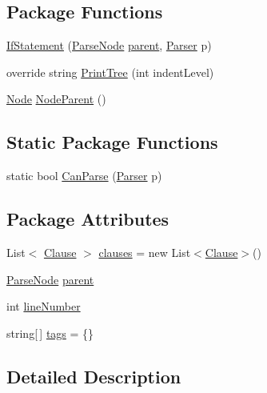 \subsection*{Package Functions}
\begin{DoxyCompactItemize}
\item 
\hyperlink{a00094_ae534078389e8663edf7660403acf3cbc}{If\-Statement} (\hyperlink{a00122}{Parse\-Node} \hyperlink{a00122_af313a82103fcc2ff5a177dbb06b92f7b}{parent}, \hyperlink{a00123}{Parser} p)
\item 
override string \hyperlink{a00094_a5494c1daef8e0f3ac3ab68f91db4f332}{Print\-Tree} (int indent\-Level)
\item 
\hyperlink{a00112}{Node} \hyperlink{a00122_a580e520a29444fc23ac3660cbe514a09}{Node\-Parent} ()
\end{DoxyCompactItemize}
\subsection*{Static Package Functions}
\begin{DoxyCompactItemize}
\item 
static bool \hyperlink{a00094_afd6b96e1a27872701c4e6832f17fc3ce}{Can\-Parse} (\hyperlink{a00123}{Parser} p)
\end{DoxyCompactItemize}
\subsection*{Package Attributes}
\begin{DoxyCompactItemize}
\item 
List$<$ \hyperlink{a00030}{Clause} $>$ \hyperlink{a00094_a679b1a21582c78ed06df36bccc9c3cbc}{clauses} = new List$<$\hyperlink{a00030}{Clause}$>$()
\item 
\hyperlink{a00122}{Parse\-Node} \hyperlink{a00122_af313a82103fcc2ff5a177dbb06b92f7b}{parent}
\item 
int \hyperlink{a00122_a18b493382de0fde5b4299c1bd2250075}{line\-Number}
\item 
string\mbox{[}$\,$\mbox{]} \hyperlink{a00122_a58b3a15788fd2d4127d73619dc6d04ae}{tags} = \{\}
\end{DoxyCompactItemize}


\subsection{Detailed Description}


